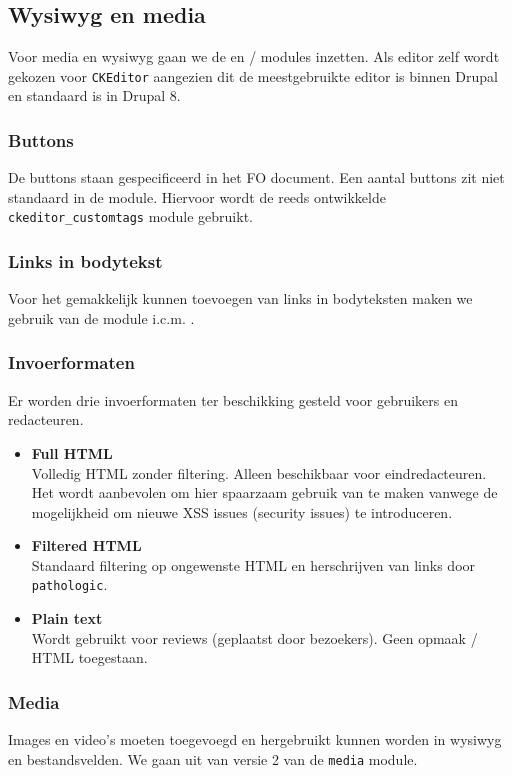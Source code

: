 \subsection{Wysiwyg en media}\label{wysiwyg}

Voor media en wysiwyg gaan we de  en  /  modules inzetten. Als editor zelf wordt gekozen voor \texttt{CKEditor} aangezien dit de meestgebruikte editor is binnen Drupal en standaard is in Drupal 8.

\subsubsection{Buttons}

De buttons staan gespecificeerd in het FO document.
Een aantal buttons zit niet standaard in de  module. Hiervoor wordt de reeds ontwikkelde \texttt{ckeditor\_customtags} module gebruikt.

\subsubsection{Links in bodytekst}

Voor het gemakkelijk kunnen toevoegen van links in bodyteksten maken we gebruik van de  module i.c.m. .

\subsubsection{Invoerformaten}\label{invoerformaten}

Er worden drie invoerformaten ter beschikking gesteld voor gebruikers en redacteuren.

\begin{itemize}
\item \textbf{Full HTML} \\
Volledig HTML zonder filtering. Alleen beschikbaar voor eindredacteuren. Het wordt aanbevolen om hier spaarzaam gebruik van te maken vanwege de mogelijkheid om nieuwe XSS issues (security issues) te introduceren.
\item \textbf{Filtered HTML} \\
Standaard filtering op ongewenste HTML en herschrijven van links door \texttt{pathologic}.
\item \textbf{Plain text} \\
Wordt gebruikt voor reviews (geplaatst door bezoekers). Geen opmaak / HTML toegestaan.
\end{itemize}

\subsubsection{Media}\label{media}

Images en video's moeten toegevoegd en hergebruikt kunnen worden in wysiwyg en bestandsvelden.
We gaan uit van versie 2 van de \texttt{media} module.


